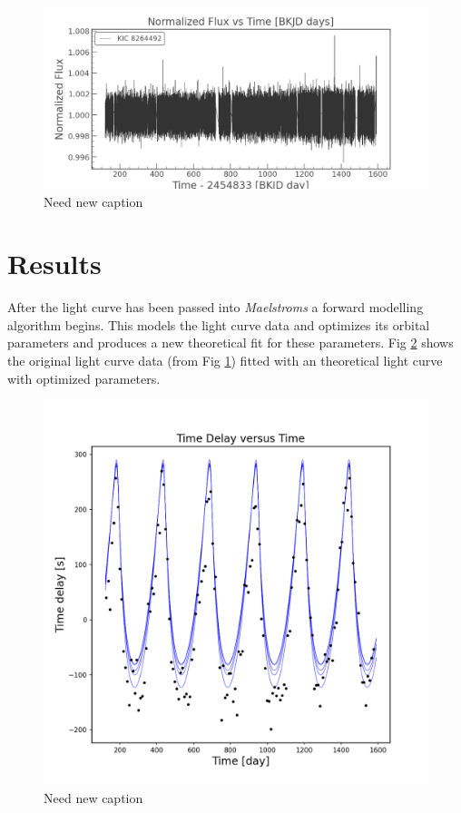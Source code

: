 \documentclass[]{article}
\begin{document}
\begin{figure}[H]
    \centering
    \includegraphics[width=1\linewidth]{Lightcurve.png}
    \caption{Need new caption}
    \label{fig:Lightcurve}
\end{figure}


\section{Results}
After the light curve has been passed into \textit{Maelstroms} a forward modelling algorithm begins. 
This models the light curve data and optimizes its orbital parameters and produces a new theoretical fit for these parameters.
Fig \ref{fig:timedelay} shows the original light curve data (from Fig \ref{fig:Lightcurve}) fitted with an theoretical light curve with optimized parameters.

\begin{figure}[H]
    \centering
    \includegraphics[width=1\linewidth]{time_delay.png}
    \caption{Need new caption}
    \label{fig:timedelay}
\end{figure}
\end{document}
